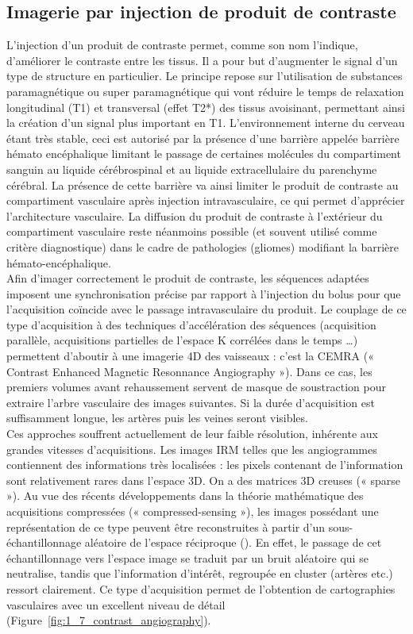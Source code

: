 \subsection{Imagerie par injection de produit de contraste}
L’injection d’un produit de contraste permet, comme son nom l’indique, d’améliorer le contraste entre les tissus. Il a pour but d’augmenter le signal d’un type de structure en particulier. Le principe repose sur l’utilisation de substances paramagnétique ou super paramagnétique qui vont réduire le temps de relaxation longitudinal (T1) et transversal (effet T2*) des tissus avoisinant, permettant ainsi la création d’un signal plus important en T1. L’environnement interne du cerveau étant très stable, ceci est autorisé par la présence d’une barrière appelée barrière hémato encéphalique limitant le passage de certaines molécules du compartiment sanguin au liquide cérébrospinal et au liquide extracellulaire du parenchyme cérébral. La présence de cette barrière va ainsi limiter le produit de contraste au compartiment vasculaire après injection intravasculaire, ce qui permet d’apprécier l’architecture vasculaire. La diffusion du produit de contraste à l’extérieur du compartiment vasculaire reste néanmoins possible (et souvent utilisé comme critère diagnostique) dans le cadre de pathologies (gliomes) modifiant la barrière hémato-encéphalique.\\
Afin d’imager correctement le produit de contraste, les séquences adaptées imposent une synchronisation précise par rapport à l’injection du bolus pour que l’acquisition coïncide avec le passage intravasculaire du produit. Le couplage de ce type d’acquisition à des techniques d’accélération des séquences (acquisition parallèle, acquisitions partielles de l’espace K corrélées dans le temps …) permettent d’aboutir à une imagerie 4D des vaisseaux : c’est la CEMRA (« Contrast Enhanced Magnetic Resonnance Angiography »). Dans ce cas, les premiers volumes avant rehaussement servent de masque de soustraction pour extraire l’arbre vasculaire des images suivantes. Si la durée d’acquisition est suffisamment longue, les artères puis les veines seront visibles.\\
Ces approches souffrent actuellement de leur faible résolution, inhérente aux grandes vitesses d’acquisitions. Les images IRM telles que les angiogrammes contiennent des informations très localisées : les pixels contenant de l’information sont relativement rares dans l’espace 3D. On a des matrices 3D creuses (« sparse »). Au vue des récents développements dans la théorie mathématique des acquisitions compressées (« compressed-sensing »), les images possédant une représentation de ce type peuvent être reconstruites à partir d’un sous-échantillonnage aléatoire de l’espace réciproque (\cite{Lustig2007}). En effet, le passage de cet échantillonnage vers l’espace image se traduit par un bruit aléatoire qui se neutralise, tandis que l’information d’intérêt, regroupée en cluster (artères etc.) ressort clairement. Ce type d’acquisition permet de l’obtention de cartographies vasculaires avec un excellent niveau de détail (Figure~\ref{fig:1_7_contrast_angiography}).
